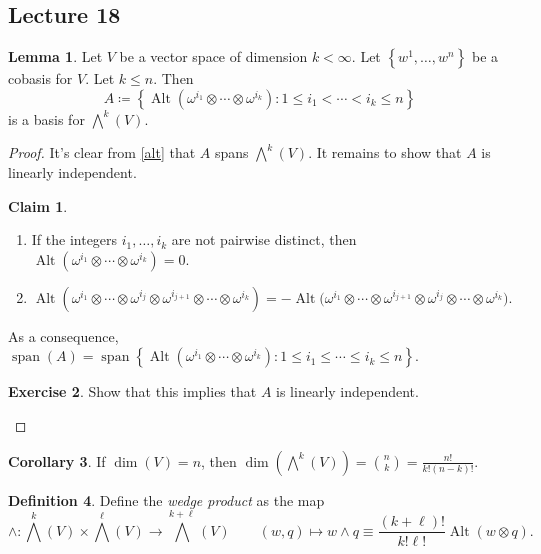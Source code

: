 \documentclass[10pt,letterpaper,cm]{nupset}
\theoremstyle{definition}
\newtheorem{definition}{Definition}[subsection]
\theoremstyle{theorem}
\newtheorem{lemma}[definition]{Lemma}
\newtheorem{corollary}[definition]{Corollary}
\newtheorem*{claim}{Claim}
\newtheorem{exercise}[definition]{Exercise}
\theoremstyle{remark}
\newcommand{\1}{\mathbf{1}}
\newcommand{\0}{\vec 0}
\DeclareMathOperator*{\Span}{span}
\DeclareMathOperator{\Alt}{Alt}
\begin{document}
\subsection{Lecture 18}

\begin{lemma}\label{bass}
Let $V$ be a vector space of dimension $k<\infty$. Let $\left\{w^1, \ldots, w^n\right\}$ be a cobasis for $V$. Let $k\leq n$. Then $$A\coloneqq   \left\{\Alt(\omega^{i_1} \otimes \cdots \otimes \omega^{i_k}) : 1 \leq i_1 < \cdots < i_k \leq n \right\} $$ is a basis for $\bigwedge^k(V)$.
\end{lemma}
\begin{proof}
It's clear from \cref{alt} that $A$ spans $\bigwedge^k(V)$. It remains to show that $A$ is linearly independent. 
\begin{claim} $ $
\begin{enumerate}[label=(\alph*)]
\item If the integers $i_1, \ldots, i_k$ are not pairwise distinct, then $\Alt(\omega^{i_1} \otimes \cdots \otimes \omega^{i_k}) = 0$.
\item $\Alt(\omega^{i_1} \otimes \cdots \otimes \omega^{i_j} \otimes \omega^{i_{j+1}} \otimes \cdots \otimes \omega^{i_k}) = {-\Alt(\omega^{i_1}} \otimes \cdots \otimes \omega^{i_{j+1}} \otimes \omega^{i_{j}} \otimes \cdots \otimes \omega^{i_k}).$
\end{enumerate}
\end{claim}%

As a consequence, $\Span(A) = \Span{\left\{\Alt(\omega^{i_1} \otimes \cdots \otimes \omega^{i_k}) : 1 \leq i_1 \leq \cdots \leq i_k \leq n\right \}}$.

\begin{exercise}
Show that this implies that $A$ is linearly independent.
\end{exercise}
\end{proof}

\begin{corollary}
If $\dim(V) = n$, then $\dim\left(\bigwedge^k(V)\right) = {n\choose k} = \frac{n!}{k!(n-k)!}$.
\end{corollary}

\begin{definition}\label{WP}
Define the \textit{wedge product} as the map $$\wedge : \bigwedge^k(V) \times \bigwedge^{\ell}(V) \to \bigwedge^{k+\ell}(V) \quad \quad (w, q) \mapsto w \wedge q \equiv  \frac{(k+\ell)!}{k! \ell!}\Alt(w\otimes q).$$  
\end{definition}
\end{document}
